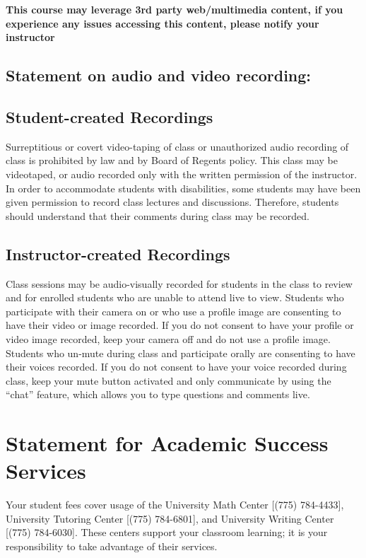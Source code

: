 \documentclass[11pt, a4paper]{article}
\begin{document}
\textbf{This course may leverage 3rd party web/multimedia content, if
  you experience any issues accessing this content, please notify your
  instructor}

\subsection*{Statement on audio and video recording:}
\subsection*{Student-created Recordings}
Surreptitious or covert video-taping of class or unauthorized audio recording of class is prohibited by law and by Board of Regents policy. This class may be videotaped, or audio recorded only with the written permission of the instructor. In order to accommodate students with disabilities, some students may have been given permission to record class lectures and discussions. Therefore, students should understand that their comments during class may be recorded.

\subsection*{Instructor-created Recordings}
Class sessions may be audio-visually recorded for students in the class to review and for enrolled students who are unable to attend live to view. Students who participate with their camera on or who use a profile image are consenting to have their video or image recorded. If you do not consent to have your profile or video image recorded, keep your camera off and do not use a profile image. Students who un-mute during class and participate orally are consenting to have their voices recorded. If you do not consent to have your voice recorded during class, keep your mute button activated and only communicate by using the ``chat'' feature, which allows you to type questions and comments live.

\section*{Statement for Academic Success Services}
Your student fees cover usage of the University Math Center [(775) 784-4433], University Tutoring Center [(775) 784-6801], and University Writing Center [(775) 784-6030]. These centers support your classroom learning; it is your responsibility to take advantage of their services.
\end{document}
